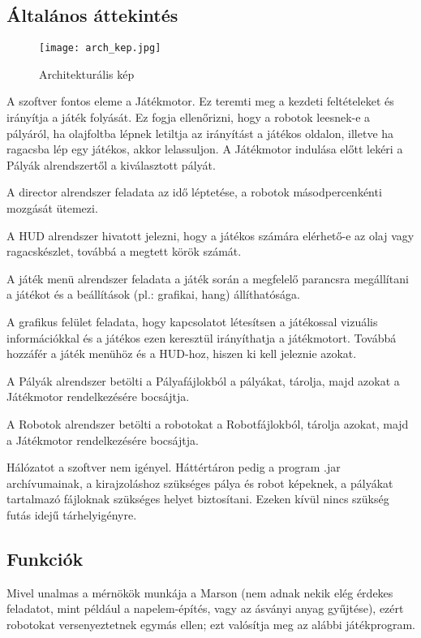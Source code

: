 \subsection{Általános áttekintés}


\begin{figure}
\centering
\texttt{[image: arch\_kep.jpg]}
\caption{Architekturális kép}
\label{fig:my_label}
\end{figure}

A szoftver fontos eleme a Játékmotor. Ez teremti meg a kezdeti feltételeket és irányítja a játék folyását. Ez fogja ellenőrizni, hogy a robotok leesnek-e a pályáról, ha olajfoltba lépnek letiltja az irányítást a játékos oldalon, illetve ha ragacsba lép egy játékos, akkor lelassuljon. A Játékmotor indulása előtt lekéri a Pályák alrendszertől a kiválasztott pályát.

A director alrendszer feladata az idő léptetése, a robotok másodpercenkénti mozgását ütemezi.

A HUD alrendszer hivatott jelezni, hogy a játékos számára elérhető-e az olaj vagy ragacskészlet, továbbá a megtett körök számát.

A játék menü alrendszer feladata a játék során a megfelelő parancsra megállítani a játékot és a beállítások (pl.: grafikai, hang) állíthatósága.

A grafikus felület feladata, hogy kapcsolatot létesítsen a játékossal vizuális információkkal és a játékos ezen keresztül irányíthatja a játékmotort. Továbbá hozzáfér a játék menühöz és a HUD-hoz, hiszen ki kell jeleznie azokat.

A Pályák alrendszer betölti a Pályafájlokból a pályákat, tárolja, majd azokat a Játékmotor rendelkezésére bocsájtja.

A Robotok alrendszer betölti a robotokat a Robotfájlokból, tárolja azokat, majd a Játékmotor rendelkezésére bocsájtja.

Hálózatot a szoftver nem igényel. Háttértáron pedig a program .jar archívumainak, a kirajzoláshoz szükséges pálya és robot képeknek, a pályákat tartalmazó fájloknak szükséges helyet biztosítani. Ezeken kívül nincs szükség futás idejű tárhelyigényre. 

\subsection{Funkciók}
Mivel unalmas a mérnökök munkája a Marson (nem adnak nekik elég érdekes feladatot, mint például a napelem-építés, vagy az ásványi anyag gyűjtése), ezért robotokat versenyeztetnek egymás ellen; ezt valósítja meg az alábbi játékprogram.

